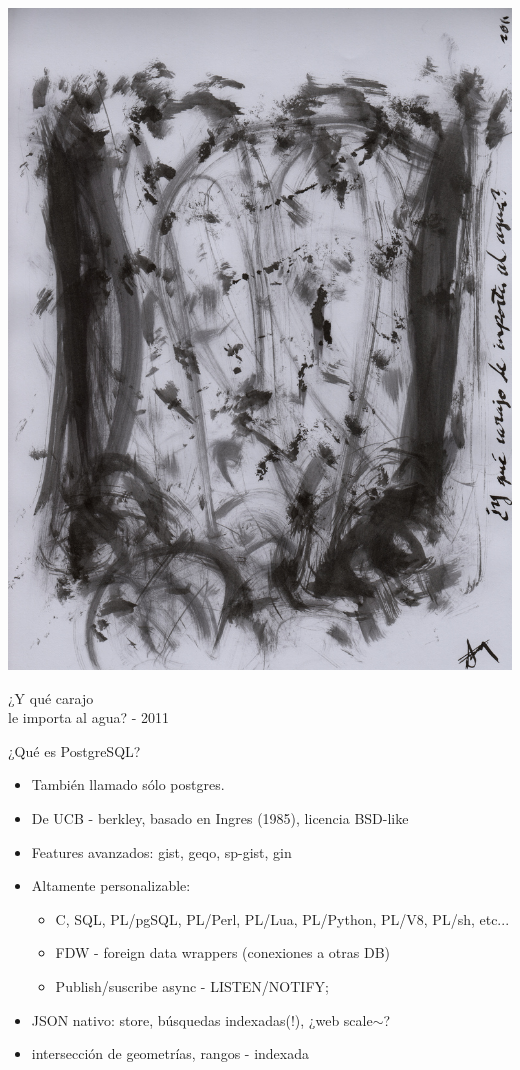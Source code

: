 \documentclass[11pt,spanish]{article}
\newcommand{\fr}[1]{%
	\begin{flushright}
		#1
	\end{flushright}
}
\newcommand{\rowsp}[1][1em]{\vspace{#1}}
\newcommand{\hone}[1]{{\rowsp[0.3em]\noindent\Large #1 \rowsp[0.3em]}}
\newcommand{\myitm}[1]{\begin{itemize}#1\end{itemize}}
\begin{document}
\begin{Row}
\begin{Cell}{1}
\ \\ %
\includegraphics[width=\textwidth]{img/carajo}
\fr{ {\tiny ¿Y qué carajo\\
le importa al agua? - 2011} }
\end{Cell}

\end{Row}


\newpage

\hone{¿Qué es PostgreSQL?}

\myitm{
	\item También llamado sólo postgres.
	\item De UCB - berkley, basado en Ingres (1985), licencia BSD-like
	\item Features avanzados: gist, geqo, sp-gist, gin
	\item Altamente personalizable: 
	\myitm{
		\item C, SQL, PL/pgSQL, PL/Perl, PL/Lua, PL/Python, PL/V8, PL/sh,
			etc...
		\item FDW - foreign data wrappers (conexiones a otras DB)
		\item Publish/suscribe async - LISTEN/NOTIFY;
	}
	\item JSON nativo: store, búsquedas indexadas(!), ¿web scale$\sim$?
	\item intersección de geometrías, rangos - indexada
}
\end{document}
